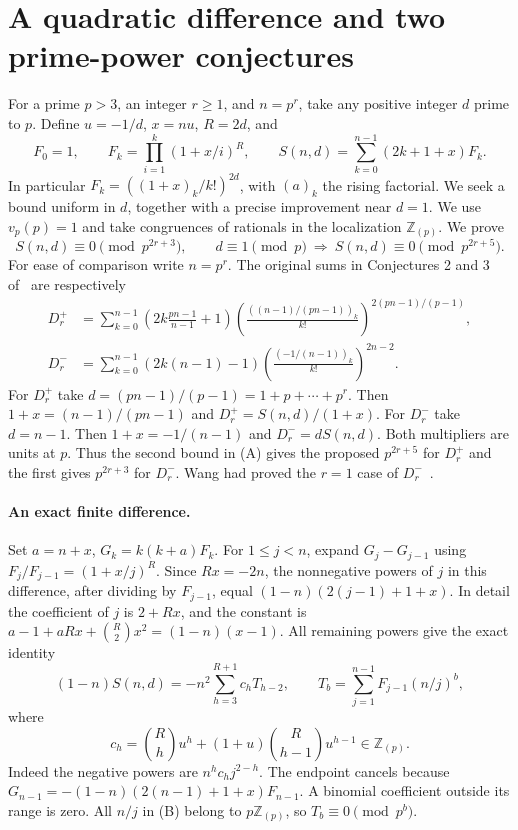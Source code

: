 \documentclass[11pt,a4paper]{article}
\numberwithin{equation}{section}
\begin{document}
\clearpage\section{A quadratic difference and two prime-power conjectures}
For a prime $p>3$, an integer $r\ge1$, and $n=p^r$, take any positive
integer $d$ prime to $p$. Define $u=-1/d$, $x=nu$, $R=2d$, and
\[
 F_0=1,\qquad F_k=\prod_{i=1}^k(1+x/i)^R,
 \qquad S(n,d)=\sum_{k=0}^{n-1}(2k+1+x)F_k.
\]
In particular $F_k=((1+x)_k/k!)^{2d}$, with $(a)_k$ the rising factorial.
We seek a bound uniform in $d$, together with a precise improvement near $d=1$. We use $v_p(p)=1$ and take congruences of rationals in the localization $\mathbb Z_{(p)}$. We prove
\[
 S(n,d)\equiv0\pmod{p^{2r+3}},\qquad
 d\equiv1\pmod p\ \Longrightarrow\ S(n,d)\equiv0\pmod{p^{2r+5}}.
\tag{A}
\]
For ease of comparison write $n=p^r$. The original sums in Conjectures 2 and 3 of~\cite[(5.8), (5.10)]{GS} are respectively
\begin{align*}
 D^+_r&=\sum_{k=0}^{n-1}\left(2k\frac{pn-1}{n-1}+1\right)
  \left(\frac{((n-1)/(pn-1))_k}{k!}\right)^{2(pn-1)/(p-1)},\\
 D^-_r&=\sum_{k=0}^{n-1}(2k(n-1)-1)
  \left(\frac{(-1/(n-1))_k}{k!}\right)^{2n-2}.
\end{align*}
For $D^+_r$ take $d=(pn-1)/(p-1)=1+p+\cdots+p^r$. Then $1+x=(n-1)/(pn-1)$ and $D^+_r=S(n,d)/(1+x)$. For $D^-_r$ take $d=n-1$. Then $1+x=-1/(n-1)$ and $D^-_r=d S(n,d)$. Both multipliers are units at $p$. Thus the second bound in (A) gives the proposed $p^{2r+5}$ for $D^+_r$ and the first gives $p^{2r+3}$ for $D^-_r$. Wang had proved the $r=1$ case of $D^-_r$~\cite{Wang}.
 
\paragraph{An exact finite difference.}
Set $a=n+x$, $G_k=k(k+a)F_k$. For $1\le j<n$, expand $G_j-G_{j-1}$
using $F_j/F_{j-1}=(1+x/j)^R$. Since $Rx=-2n$, the nonnegative powers
of $j$ in this difference, after dividing by $F_{j-1}$, equal
$(1-n)(2(j-1)+1+x)$. In detail the coefficient of $j$ is $2+Rx$,
and the constant is $a-1+aRx+\binom R2x^2=(1-n)(x-1)$.
All remaining powers give the exact identity
\[
 (1-n)S(n,d)=-n^2\sum_{h=3}^{R+1} c_h T_{h-2},\qquad
 T_b=\sum_{j=1}^{n-1} F_{j-1}(n/j)^b,
\tag{B}
\]
where
\[
 c_h=\binom Rh u^h+(1+u)\binom R{h-1}u^{h-1}\in\mathbb Z_{(p)}.
\]
Indeed the negative powers are $n^hc_hj^{2-h}$. The endpoint cancels
because $G_{n-1}=-(1-n)(2(n-1)+1+x)F_{n-1}$. A binomial coefficient
outside its range is zero. All $n/j$ in (B) belong to $p\mathbb Z_{(p)}$,
so $T_b\equiv0\pmod{p^b}$.
\end{document}
